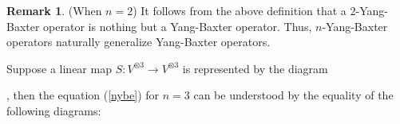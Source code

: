 \documentclass[a4paper,reqno,10pt]{amsart}
\theoremstyle{plain}
\theoremstyle{definition}
\newtheorem{remark}[thm]{Remark}
\theoremstyle{remark}
\begin{document}
\begin{remark} (When $n=2$)
    It follows from the above definition that a $2$-Yang-Baxter operator is nothing but a Yang-Baxter operator. Thus, $n$-Yang-Baxter operators naturally generalize Yang-Baxter operators.
\end{remark}

Suppose a linear map $S : V^{\otimes 3} \rightarrow V^{\otimes 3}$ is represented by the diagram ~~~ \!  \!  , then the equation (\ref{nybe}) for $n=3$ can be understood by the equality of the following diagrams:

    \medskip

    \medskip
\end{document}
